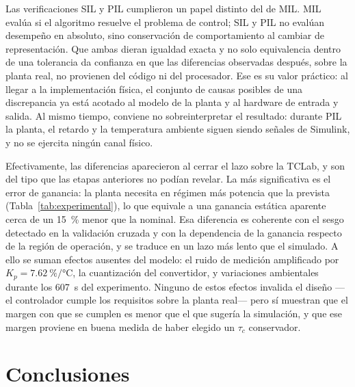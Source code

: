 \documentclass[conference,a4paper,10pt]{IEEEtran}
\newcommand{\Kp}{K_p}
\begin{document}
Las verificaciones SIL y PIL cumplieron un papel distinto del de MIL. MIL evalúa si el algoritmo
resuelve el problema de control; SIL y PIL no evalúan desempeño en absoluto, sino conservación de
comportamiento al cambiar de representación. Que ambas dieran igualdad exacta y no solo equivalencia
dentro de una tolerancia da confianza en que las diferencias observadas después, sobre la planta
real, no provienen del código ni del procesador. Ese es su valor práctico: al llegar a la
implementación física, el conjunto de causas posibles de una discrepancia ya está acotado al modelo
de la planta y al hardware de entrada y salida. Al mismo tiempo, conviene no sobreinterpretar el
resultado: durante PIL la planta, el retardo y la temperatura ambiente siguen siendo señales de
Simulink, y no se ejercita ningún canal físico.

Efectivamente, las diferencias aparecieron al cerrar el lazo sobre la TCLab, y son del tipo que las
etapas anteriores no podían revelar. La más significativa es el error de ganancia: la planta
necesita en régimen más potencia que la prevista (Tabla~\ref{tab:experimental}), lo que equivale a
una ganancia estática aparente cerca de un \SI{15}{\percent} menor que la nominal. Esa
diferencia es coherente con el sesgo detectado en la validación cruzada y con la dependencia de la
ganancia respecto de la región de operación, y se traduce en un lazo más lento que el simulado. A
ello se suman efectos ausentes del modelo: el ruido de medición amplificado por
$\Kp = \SI{7.62}{\percent\per\celsius}$, la cuantización del convertidor, y variaciones ambientales
durante los \SI{607}{\second} del experimento. Ninguno de estos efectos invalida el diseño ---el
controlador cumple los requisitos sobre la planta real--- pero sí muestran que el margen con que se
cumplen es menor que el que sugería la simulación, y que ese margen proviene en buena medida de
haber elegido un $\tau_c$ conservador.

\section{Conclusiones}
\end{document}

